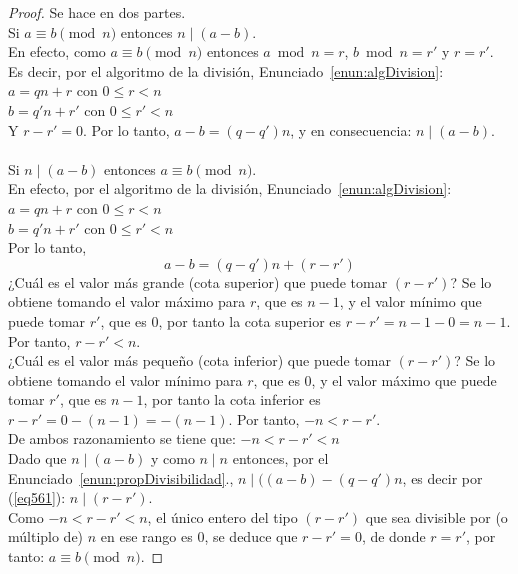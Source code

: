 \begin{proof} Se hace en dos partes. \\
Si $a \equiv b \pmod n$ entonces $n \mid (a - b)$. \\
En efecto, como $a \equiv b \pmod n$ entonces  $a \bmod n = r$, $b \bmod n = r'$ y $r = r'$. Es decir, por el algoritmo de la división, Enunciado~\ref{enun:algDivision}: \\ 
$a = qn + r$ con $0 \leq r < n$ \\ 
$b = q'n + r'$ con $0 \leq r' < n$ \\ 
Y $r - r' =  0$. Por lo tanto, $a - b =  (q - q')n$, y en consecuencia: $n \mid (a-b)$. \\ \\
Si $n \mid (a - b)$ entonces $a \equiv b \pmod n$.\\
En efecto, por el algoritmo de la división, Enunciado~\ref{enun:algDivision}: \\ 
$a = qn + r$ con $0 \leq r < n$ \\ 
$b = q'n + r'$ con $0 \leq r' < n$ \\ 
Por lo tanto, 
\begin{equation}
    \label{eq561}
    a - b =  (q - q')n  +  (r - r') 
\end{equation}
¿Cuál es el valor más grande (cota superior) que puede tomar $(r - r')$? 
Se lo obtiene tomando el valor máximo para $r$, que es $n-1$, y el valor mínimo que puede tomar $r'$, que es 0, por tanto la cota superior es $r - r' = n - 1 - 0 = n - 1$.
Por tanto, $ r - r' < n$. \\
¿Cuál es el valor más pequeño (cota inferior) que puede tomar $(r - r')$? 
Se lo obtiene tomando el valor mínimo para $r$, que es $0$, y el valor máximo que puede tomar $r'$, que es $n-1$, por tanto la cota inferior es $r - r' = 0 - (n - 1) = - (n - 1)$.
Por tanto, $-n < r - r' $. \\
De ambos razonamiento se tiene que:  $-n < r - r' < n$ \\ 
Dado que $n \mid (a - b)$ y como $n \mid n$ entonces, \setcounter{enumi}{1} por el Enunciado~\ref{enun:propDivisibilidad}., $n \mid ((a - b) - (q - q')n$, es decir por (\ref{eq561}):  $n \mid (r - r')$. \\ 
Como  $ -n < r - r' < n$, el único entero del tipo $(r - r')$ que sea divisible por (o múltiplo de) $n$ en ese rango es $0$, se deduce que $r - r' = 0$, de donde $r = r'$, por tanto: $a \equiv b \pmod n$.
\end{proof}

